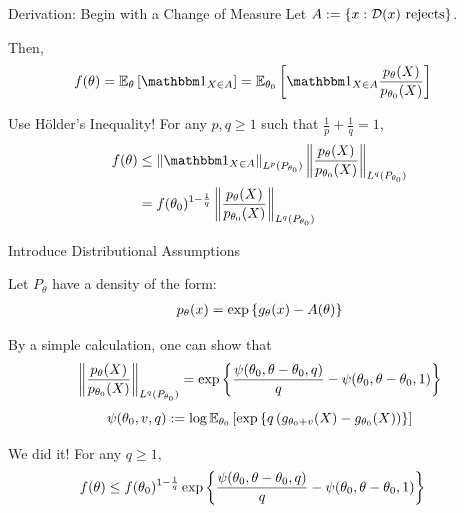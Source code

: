 \begin{frame}{Derivation: Begin with a Change of Measure}
Let $A := \{x : \mathcal{D}(x) \text{ rejects}\}$.

Then,
\begin{align*}
    f(\theta)
    &=
    \EEE_\theta\br{\indic{X \in A}}
    =
    \EEE_{\theta_0}\br{\indic{X \in A} \frac{p_\theta(X)}{p_{\theta_0}(X)}}
\end{align*}
\end{frame}

\begin{frame}{Use H\"{o}lder's Inequality!}
For any $p, q \geq 1$ such that $\frac{1}{p} + \frac{1}{q} = 1$,
\begin{align*}
    f(\theta) 
    &\leq
    \norm{\indic{X \in A}}_{L^p(P_{\theta_0})}
    \norm{\frac{p_\theta(X)}{p_{\theta_0}(X)}}_{L^q(P_{\theta_0})}
    \\&=
    f(\theta_0)^{1-\frac{1}{q}} 
    \norm{\frac{p_\theta(X)}{p_{\theta_0}(X)}}_{L^q(P_{\theta_0})}
\end{align*} 
\end{frame}

\begin{frame}{Introduce Distributional Assumptions}

Let $P_\theta$ have a density of the form:
\begin{align*}
    p_\theta(x)
    =
    \exp\left\{g_\theta(x) - A(\theta)\right\}
\end{align*}

By a simple calculation, one can show that
\begin{equation*}
    \left\|\frac{p_\theta(X)}{p_{\theta_0}(X)}\right\|_{L^q(P_{\theta_0})}
    =
    \exp\left\{
        \frac{\psi(\theta_0, \theta-\theta_0, q)}{q}
        - \psi(\theta_0, \theta-\theta_0, 1)
    \right\}
\end{equation*} 
\begin{equation*}
    \psi(\theta_0, v, q)
    :=
    \log\mathbb{E}_{\theta_0}\left[\exp\left\{q\left( g_{\theta_0+v}(X)-g_{\theta_0}(X) \right)\right\}\right]
\end{equation*} 
\end{frame}

\begin{frame}{We did it!}
For any $q \geq 1$,
\begin{align*}
    f(\theta)
    &\leq
    f(\theta_0)^{1 - \frac{1}{q}}
    \exp\left\{\frac{\psi(\theta_0, \theta-\theta_0, q)}{q} - \psi(\theta_0, \theta-\theta_0, 1)\right\}
\end{align*}
\end{frame}

